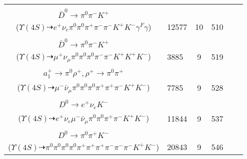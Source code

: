 \documentclass[landscape]{article}
\newcounter{rownumbers}
\newcommand\rn{\stepcounter{rownumbers}\arabic{rownumbers}}
\newcommand{\EOLP}{\\ \hline} %
\newcommand{\topoTags}[1]{#1} %
\begin{document}
\begin{longtable}{clcccc}
\rn & \makecell[l]{ $ 
\Upsilon(4S) \rightarrow B^{+} B^{-} ,
B^{+} \rightarrow e^{+} \nu_{e} \bar{D}^{*0} \gamma^{F} ,
B^{-} \rightarrow \rho^{-} D^{0} ,
\bar{D}^{*0} \rightarrow \bar{D}^{0} \gamma ,
\rho^{-} \rightarrow \pi^{0} \pi^{-} ,
D^{0} \rightarrow \pi^{+} K^{-} ,
$ \\ $
\bar{D}^{0} \rightarrow \pi^{0} \pi^{-} K^{+} 
$ \\ ($
\Upsilon(4S) \dashrightarrow e^{+} \nu_{e} \pi^{0} \pi^{0} \pi^{+} \pi^{-} \pi^{-} K^{+} K^{-} \gamma^{F} \gamma 
$) } & \topoTags{12577 & }10 & 510 \EOLP

\rn & \makecell[l]{ $ 
\Upsilon(4S) \rightarrow B^{+} B^{-} ,
B^{+} \rightarrow \mu^{+} \nu_{\mu} \bar{D}^{*0} ,
B^{-} \rightarrow \rho^{-} D^{0} ,
\bar{D}^{*0} \rightarrow \pi^{0} \bar{D}^{0} ,
\rho^{-} \rightarrow \pi^{0} \pi^{-} ,
D^{0} \rightarrow K^{+} K^{-} ,
$ \\ $
\bar{D}^{0} \rightarrow \pi^{0} \pi^{-} K^{+} 
$ \\ ($
\Upsilon(4S) \dashrightarrow \mu^{+} \nu_{\mu} \pi^{0} \pi^{0} \pi^{0} \pi^{-} \pi^{-} K^{+} K^{+} K^{-} 
$) } & \topoTags{3885 & }9 & 519 \EOLP

\rn & \makecell[l]{ $ 
\Upsilon(4S) \rightarrow B^{+} B^{-} ,
B^{+} \rightarrow \rho^{+} \bar{D}^{0} ,
B^{-} \rightarrow \mu^{-} \bar{\nu}_{\mu} D^{0} ,
\rho^{+} \rightarrow \pi^{0} \pi^{+} ,
\bar{D}^{0} \rightarrow \pi^{-} K^{+} ,
D^{0} \rightarrow K^{-} a_{1}^{+} ,
$ \\ $
a_{1}^{+} \rightarrow \pi^{0} \rho^{+} ,
\rho^{+} \rightarrow \pi^{0} \pi^{+} 
$ \\ ($
\Upsilon(4S) \dashrightarrow \mu^{-} \bar{\nu}_{\mu} \pi^{0} \pi^{0} \pi^{0} \pi^{+} \pi^{+} \pi^{-} K^{+} K^{-} 
$) } & \topoTags{7785 & }9 & 528 \EOLP

\rn & \makecell[l]{ $ 
\Upsilon(4S) \rightarrow B^{+} B^{-} ,
B^{+} \rightarrow \rho^{+} \bar{D}^{0} ,
B^{-} \rightarrow \mu^{-} \bar{\nu}_{\mu} D^{*0} ,
\rho^{+} \rightarrow \pi^{0} \pi^{+} ,
\bar{D}^{0} \rightarrow \pi^{-} K^{+} ,
D^{*0} \rightarrow \pi^{0} D^{0} ,
$ \\ $
D^{0} \rightarrow e^{+} \nu_{e} K^{-} 
$ \\ ($
\Upsilon(4S) \dashrightarrow e^{+} \nu_{e} \mu^{-} \bar{\nu}_{\mu} \pi^{0} \pi^{0} \pi^{+} \pi^{-} K^{+} K^{-} 
$) } & \topoTags{11844 & }9 & 537 \EOLP

\rn & \makecell[l]{ $ 
\Upsilon(4S) \rightarrow B^{+} B^{-} ,
B^{+} \rightarrow \rho^{+} \bar{D}^{0} ,
B^{-} \rightarrow \pi^{0} \pi^{+} \pi^{-} \pi^{-} D^{*0} ,
\rho^{+} \rightarrow \pi^{0} \pi^{+} ,
\bar{D}^{0} \rightarrow \pi^{-} K^{+} ,
D^{*0} \rightarrow \pi^{0} D^{0} ,
$ \\ $
D^{0} \rightarrow \pi^{0} \pi^{+} K^{-} 
$ \\ ($
\Upsilon(4S) \dashrightarrow \pi^{0} \pi^{0} \pi^{0} \pi^{0} \pi^{+} \pi^{+} \pi^{+} \pi^{-} \pi^{-} \pi^{-} K^{+} K^{-} 
$) } & \topoTags{20843 & }9 & 546 \EOLP


\end{longtable}
\end{document}
